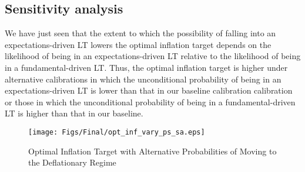 \documentclass[11pt]{article}
\begin{document}
	\subsection{Sensitivity analysis}

	We have just seen that the extent to which the possibility of falling into an expectations-driven LT lowers the optimal inflation target depends on the likelihood of being in an expectations-driven LT relative to the likelihood of being in a fundamental-driven LT. Thus, the optimal inflation target is higher under alternative calibrations in which the unconditional probability of being in an expectations-driven LT is lower than that in our baseline calibration calibration or those in which the unconditional probability of being in a fundamental-driven LT is higher than that in our baseline.


	\begin{figure}[!h]
		\begin{center}
			\caption{Optimal Inflation Target with Alternative Probabilities of Moving to the Deflationary Regime\label{fig:OptimalPiTarg_SA}}
			\texttt{[image: Figs/Final/opt\_inf\_vary\_ps\_sa.eps]}\\
		\end{center}
	\end{figure}
\end{document}
